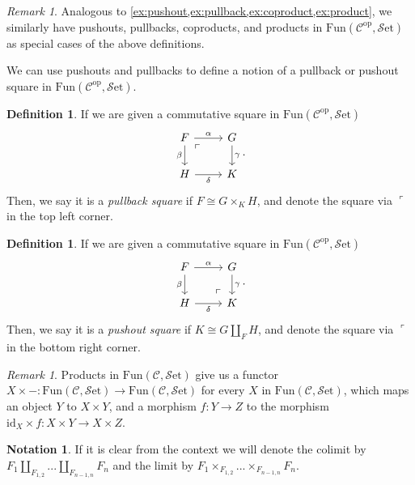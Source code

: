 \documentclass[11pt, a4paper]{amsart}
\newcommand{\cC}{\mathcal{C}}
\newcommand{\op}{\mathrm{op}}
\newcommand{\Fun}{\mathrm{Fun}}
\newcommand{\Set}{\mathscr{S}\mathrm{et}}
\newcommand{\id}{\mathrm{id}}
\theoremstyle{definition}
\newtheorem{definition}[equation]{Definition}
\newtheorem{notation}[equation]{Notation}
\theoremstyle{remark}
\newtheorem{remark}[equation]{Remark}
\numberwithin{equation}{section}
\begin{document}
\begin{remark}
  Analogous to \cref{ex:pushout,ex:pullback,ex:coproduct,ex:product}, we similarly have pushouts, pullbacks, coproducts, and products in $\Fun(\cC^{\op},\Set)$ as special cases of the above definitions.
\end{remark}

We can use pushouts and pullbacks to define a notion of a pullback or pushout square in $\Fun(\cC^{\op},\Set)$.
\begin{definition} \label{def:pullback square}
  If we are given a commutative square in $\Fun(\cC^{\op},\Set)$
  \[
  \begin{tikzcd}
    F \arrow[r, "\alpha"] \arrow[d, "\beta"'] \arrow[dr, phantom, "\ulcorner", very near start] & G \arrow[d, "\gamma"] \\
    H \arrow[r, "\delta"'] & K
  \end{tikzcd}.
  \]
  Then, we say it is a \emph{pullback square} if $F \cong G \times_K H$, and denote the square via $\ulcorner$ in the top left corner.
\end{definition}

\begin{definition} \label{def:pushout square}
  If we are given a commutative square in $\Fun(\cC^{\op},\Set)$
  \[
  \begin{tikzcd}
    F \arrow[r, "\alpha"] \arrow[d, "\beta"'] & G \arrow[d, "\gamma"] \\
    H \arrow[r, "\delta"'] & K  \arrow[ul, phantom, "\ulcorner", very near start]
  \end{tikzcd}.
  \]
  Then, we say it is a \emph{pushout square} if $K \cong G \coprod_F H$, and denote the square via $\ulcorner$ in the bottom right corner.
\end{definition}

\begin{remark} \label{rem:products functor}
  Products in $\Fun(\cC,\Set)$ give us a functor $X \times - \colon \Fun(\cC,\Set) \to \Fun(\cC,\Set)$ for every $X$ in $\Fun(\cC,\Set)$, which maps an object $Y$ to $X \times Y$, and a morphism $f\colon Y \to Z$ to the morphism $\id_X \times f \colon X \times Y \to X \times Z$.
\end{remark}
\begin{notation}
 If it is clear from the context we will denote the colimit by $F_1 \coprod_{F_{1,2}} ... \coprod_{F_{n-1, n}} F_n$ and the limit by $F_1 \times_{F_{1,2}} ... \times_{F_{n-1, n}} F_n$.  
\end{notation}
\end{document}
